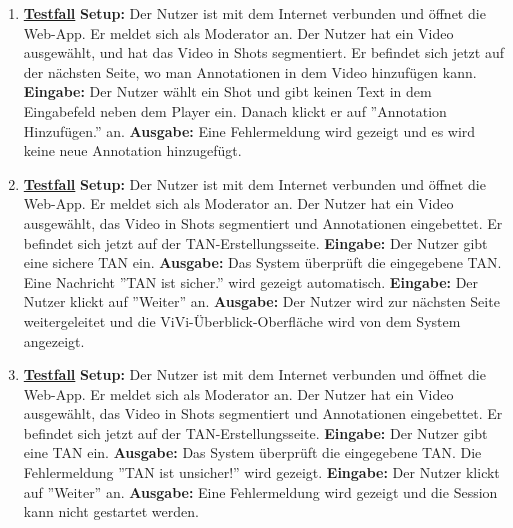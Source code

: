 \begin{enumerate}
	\item \underline{\textbf{Testfall}} \linebreak
	\textbf{Setup:} Der Nutzer ist mit dem Internet verbunden und öffnet die Web-App. Er meldet sich als Moderator an. Der Nutzer hat ein Video ausgewählt, und hat das Video in Shots segmentiert. Er befindet sich jetzt auf der nächsten Seite, wo man Annotationen in dem Video hinzufügen kann.\linebreak
	\textbf{Eingabe:} Der Nutzer wählt ein Shot und gibt keinen Text in dem Eingabefeld neben dem Player ein. Danach klickt er auf ''Annotation Hinzufügen.'' an.\linebreak
	\textbf{Ausgabe:} Eine Fehlermeldung wird gezeigt und es wird keine neue Annotation hinzugefügt.
	
	\item \underline{\textbf{Testfall}} \linebreak
	\textbf{Setup:} Der Nutzer ist mit dem Internet verbunden und öffnet die Web-App. Er meldet sich als Moderator an. Der Nutzer hat ein Video ausgewählt, das Video in Shots segmentiert und Annotationen eingebettet. Er befindet sich jetzt auf der TAN-Erstellungsseite.\linebreak
	\textbf{Eingabe:} Der Nutzer gibt eine sichere TAN ein.\linebreak
	\textbf{Ausgabe:} Das System überprüft die eingegebene TAN. Eine Nachricht ''TAN ist sicher.'' wird gezeigt automatisch.\linebreak
	\textbf{Eingabe:} Der Nutzer klickt auf ''Weiter'' an.\linebreak
	\textbf{Ausgabe:} Der Nutzer wird zur nächsten Seite weitergeleitet und die ViVi-Überblick-Oberfläche wird von dem System angezeigt.
	
	\item \underline{\textbf{Testfall}} \linebreak
	\textbf{Setup:} Der Nutzer ist mit dem Internet verbunden und öffnet die Web-App. Er meldet sich als Moderator an. Der Nutzer hat ein Video ausgewählt, das Video in Shots segmentiert und Annotationen eingebettet. Er befindet sich jetzt auf der TAN-Erstellungsseite.\linebreak
	\textbf{Eingabe:} Der Nutzer gibt eine TAN ein.\linebreak
	\textbf{Ausgabe:} Das System überprüft die eingegebene TAN. Die Fehlermeldung ''TAN ist unsicher!'' wird gezeigt.\linebreak
	\textbf{Eingabe:} Der Nutzer klickt auf ''Weiter'' an.\linebreak
	\textbf{Ausgabe:} Eine Fehlermeldung wird gezeigt und die Session kann nicht gestartet werden.
	

\end{enumerate}
